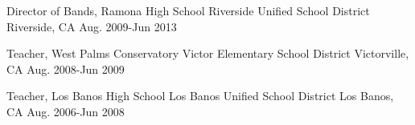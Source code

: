 \begin{cventries}
  \cventry
    {Director of Bands, Ramona High School} %
    {Riverside Unified School District} %
    {Riverside, CA} %
    {Aug. 2009-Jun 2013} %
    {}

  \cventry
    {Teacher, West Palms Conservatory} %
    {Victor Elementary School District} %
    {Victorville, CA} %
    {Aug. 2008-Jun 2009} %
    {}


  \cventry
    {Teacher, Los Banos High School} %
    {Los Banos Unified School District} %
    {Los Banos, CA} %
    {Aug. 2006-Jun 2008} %
    {}


\end{cventries}

